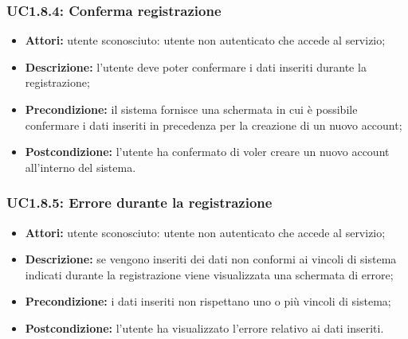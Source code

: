 \subsubsection{UC1.8.4: Conferma registrazione}

\begin{itemize}
   	\item \textbf{Attori:} utente sconosciuto: utente non autenticato che accede al servizio;
    \item \textbf{Descrizione:} l'utente deve poter confermare i dati inseriti durante la registrazione;
    \item \textbf{Precondizione:} il sistema fornisce una schermata in cui è possibile confermare i dati inseriti in precedenza per la creazione di un nuovo account;
    \item \textbf{Postcondizione:} l'utente ha confermato di voler creare un nuovo account all'interno
    del sistema.
\end{itemize}

\subsubsection{UC1.8.5: Errore durante la registrazione}

\begin{itemize}
   	\item \textbf{Attori:} utente sconosciuto: utente non autenticato che accede al servizio;
    \item \textbf{Descrizione:} se vengono inseriti dei dati non conformi ai vincoli di sistema indicati durante la registrazione viene visualizzata una schermata di errore;
    \item \textbf{Precondizione:} i dati inseriti non rispettano uno o più vincoli di sistema;
    \item \textbf{Postcondizione:} l'utente ha visualizzato l'errore relativo ai dati inseriti.
\end{itemize}

\pagebreak
